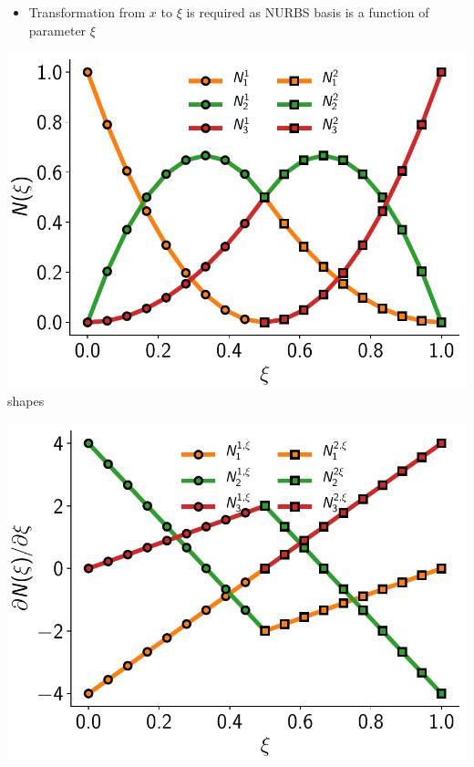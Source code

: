 \documentclass{beamer}
\begin{document}
\begin{frame}[allowframebreaks]
\begin{itemize}
\item Transformation from $x$ to $\xi$ is required as NURBS
  basis is a function of parameter $\xi$
  
  \end{itemize}

  \newpage

  \begin{minipage}[b]{0.48\linewidth}
    \includegraphics[width=1.0\textwidth]{figures/bar-basis-functions.pdf} \\
    \centering \footnotesize{shapes}
  \end{minipage}
  \begin{minipage}[b]{0.48\linewidth}
    \includegraphics[width=1.0\textwidth]{figures/bar-basis-function-derivatives.pdf} \\

\end{minipage}
\end{frame}
\end{document}

